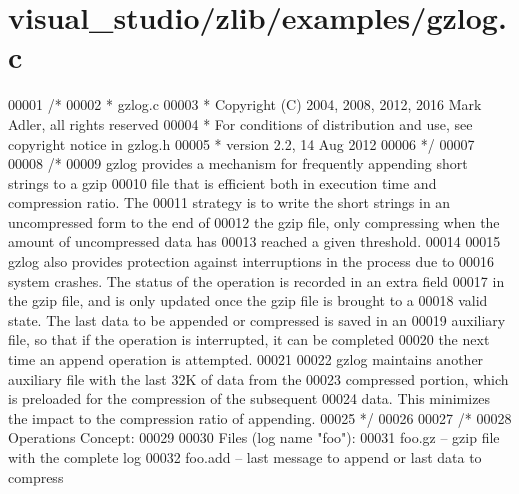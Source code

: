 \hypertarget{visual__studio_2zlib_2examples_2gzlog_8c_source}{}\section{visual\+\_\+studio/zlib/examples/gzlog.c}
\label{visual__studio_2zlib_2examples_2gzlog_8c_source}

\begin{DoxyCode}
00001 \textcolor{comment}{/*}
00002 \textcolor{comment}{ * gzlog.c}
00003 \textcolor{comment}{ * Copyright (C) 2004, 2008, 2012, 2016 Mark Adler, all rights reserved}
00004 \textcolor{comment}{ * For conditions of distribution and use, see copyright notice in gzlog.h}
00005 \textcolor{comment}{ * version 2.2, 14 Aug 2012}
00006 \textcolor{comment}{ */}
00007 
00008 \textcolor{comment}{/*}
00009 \textcolor{comment}{   gzlog provides a mechanism for frequently appending short strings to a gzip}
00010 \textcolor{comment}{   file that is efficient both in execution time and compression ratio.  The}
00011 \textcolor{comment}{   strategy is to write the short strings in an uncompressed form to the end of}
00012 \textcolor{comment}{   the gzip file, only compressing when the amount of uncompressed data has}
00013 \textcolor{comment}{   reached a given threshold.}
00014 \textcolor{comment}{}
00015 \textcolor{comment}{   gzlog also provides protection against interruptions in the process due to}
00016 \textcolor{comment}{   system crashes.  The status of the operation is recorded in an extra field}
00017 \textcolor{comment}{   in the gzip file, and is only updated once the gzip file is brought to a}
00018 \textcolor{comment}{   valid state.  The last data to be appended or compressed is saved in an}
00019 \textcolor{comment}{   auxiliary file, so that if the operation is interrupted, it can be completed}
00020 \textcolor{comment}{   the next time an append operation is attempted.}
00021 \textcolor{comment}{}
00022 \textcolor{comment}{   gzlog maintains another auxiliary file with the last 32K of data from the}
00023 \textcolor{comment}{   compressed portion, which is preloaded for the compression of the subsequent}
00024 \textcolor{comment}{   data.  This minimizes the impact to the compression ratio of appending.}
00025 \textcolor{comment}{ */}
00026 
00027 \textcolor{comment}{/*}
00028 \textcolor{comment}{   Operations Concept:}
00029 \textcolor{comment}{}
00030 \textcolor{comment}{   Files (log name "foo"):}
00031 \textcolor{comment}{   foo.gz -- gzip file with the complete log}
00032 \textcolor{comment}{   foo.add -- last message to append or last data to compress}

\end{DoxyCode}
